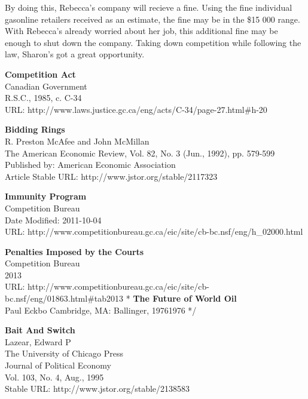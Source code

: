 \documentclass[12pt]{article}
\newcommand\bold[1]{\textbf{#1}}
\begin{document}
By doing this, Rebecca's company will recieve a fine. Using the fine individual gasonline retailers received as an estimate, the fine may be in the \$15 000  range.\cite[2013]{penalties} With Rebecca's already worried about her job, this additional fine may be enough to shut down the company. Taking down competition while following the law, Sharon's got a great opportunity.

\begin{thebibliography}{1}

\bold{Competition Act}\\
Canadian Government\\
R.S.C., 1985, c. C-34\\
URL: http://www.laws.justice.gc.ca/eng/acts/C-34/page-27.html\#h-20


\bold{Bidding Rings}\\
R. Preston McAfee and John McMillan\\
The American Economic Review, Vol. 82, No. 3 (Jun., 1992), pp. 579-599\\
Published by: American Economic Association\\
Article Stable URL: http://www.jstor.org/stable/2117323

\bold{Immunity Program}\\
Competition Bureau\\
Date Modified: 2011-10-04\\
URL: http://www.competitionbureau.gc.ca/eic/site/cb-bc.nsf/eng/h\_02000.html

\bold{Penalties Imposed by the Courts}\\
Competition Bureau\\
2013\\
URL: http://www.competitionbureau.gc.ca/eic/site/cb-bc.nsf/eng/01863.html\#tab2013
\/*
\bold{The Future of World Oil}\\
Paul Eckbo
Cambridge, MA: Ballinger, 19761976
*/

\bold{Bait And Switch}\\
Lazear, Edward P\\
The University of Chicago Press\\
Journal of Political Economy\\
Vol. 103, No. 4, Aug., 1995\\
Stable URL: http://www.jstor.org/stable/2138583

  \end{thebibliography}
\end{document}
